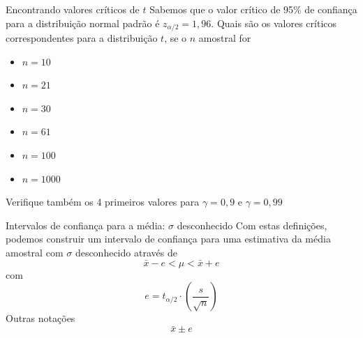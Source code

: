 \documentclass[10pt]{beamer}\usepackage[]{graphicx}\usepackage[]{color}
\theoremstyle{definition}
\begin{document}
\begin{frame}{Encontrando valores críticos de $t$}
  Sabemos que o valor crítico de 95\% de confiança para a distribuição
  normal padrão é $z_{\alpha/2} = 1,96$. Quais são os valores críticos
  correspondentes para a distribuição $t$, se o $n$ amostral for
  \begin{itemize}
  \item $n=10$
  \item $n=21$
  \item $n=30$
  \item $n=61$
  \item $n=100$
  \item $n=1000$
  \end{itemize}
  Verifique também os 4 primeiros valores para $\gamma = 0,9$ e $\gamma
  = 0,99$
\end{frame}

\begin{frame}{Intervalos de confiança para a média: $\sigma$ desconhecido}
  Com estas definições, podemos construir um intervalo de confiança para
  uma estimativa da média amostral com $\sigma$ desconhecido através de
  \begin{equation*}
    \bar{x} - e < \mu < \bar{x} + e
  \end{equation*}
  com
  \begin{equation*}
    e = t_{\alpha/2} \cdot \left(\frac{s}{\sqrt{n}}\right)
  \end{equation*}
  Outras notações
  \begin{equation*}
    \bar{x} \pm e
  \end{equation*}
  \begin{equation*}
    [\bar{x} - e; \bar{x} + e]
  \end{equation*}
\end{frame}
\end{document}
